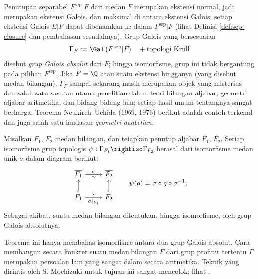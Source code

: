 Penutupan separabel $F^\text{sep}|F$ dari medan $F$ merupakan ekstensi normal, jadi merupakan ekstensi Galois, dan maksimal di antara ekstensi Galois: setiap ekstensi Galois $E|F$ dapat dibenamkan ke dalam $F^\text{sep}|F$ (lihat Definisi \ref{def:sep-closure} dan pembahasan sesudahnya). Grup Galois yang bersesuaian 
\[ \Gamma_F:=\Gal\left(F^\text{sep}|F\right) \quad + \text{topologi Krull} \]
disebut \emph{grup Galois absolut} dari $F$; hingga isomorfisme, grup ini tidak bergantung pada pilihan $F^\text{sep}$. Jika $F=\Q$ atau suatu ekstensi hingganya (yang disebut medan bilangan), $\Gamma_F$ sampai sekarang masih merupakan objek yang misterius dan salah satu sasaran utama penelitian dalam teori bilangan aljabar, geometri aljabar aritmetika, dan bidang-bidang lain; setiap hasil umum tentangnya sangat berharga. Teorema Neukirch--Uchida (1969, 1976) berikut adalah contoh terkenal dan juga salah satu landasan \emph{geometri anabelian}.
\begin{theorem}
	Misalkan $F_1$, $F_2$ medan bilangan, dan tetapkan penutup aljabar $\overline{F_1}$, $\overline{F_2}$. Setiap isomorfisme grup topologis $\psi: \Gamma_{F_1} \rightiso \Gamma_{F_2}$ berasal dari isomorfisme medan unik $\sigma$ dalam diagram berikut:
	\[\begin{tikzcd}
		\overline{F_1} \arrow[r, "\sigma", "\sim"'] & \overline{F_2} \\
		F_1 \arrow[hookrightarrow, u] \arrow[r, "{\sigma|_{F_1}}"', "\sim"] & F_2 \arrow[hookrightarrow, u]
	\end{tikzcd} \qquad \psi(g) = \sigma \circ g \circ \sigma^{-1}; \]
	Sebagai akibat, suatu medan bilangan ditentukan, hingga isomorfisme, oleh grup Galois absolutnya.
\end{theorem}
Teorema ini hanya membahas isomorfisme antara dua grup Galois absolut. Cara membangun secara konkret suatu medan bilangan $F$ dari grup profinit tertentu $\Gamma$ merupakan persoalan lain yang sangat dalam secara aritmetika. Teknik yang dirintis oleh S. Mochizuki untuk tujuan ini sangat mencolok; lihat \cite{MzkT3}.

